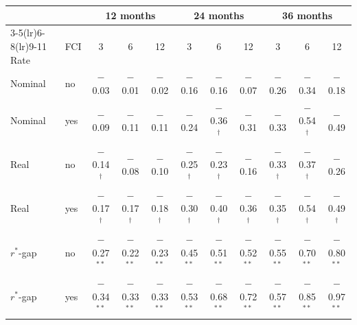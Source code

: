 \begin{tabular}{llccccccccc}
\toprule
 & & \multicolumn{3}{c}{12 months} & \multicolumn{3}{c}{24 months} & \multicolumn{3}{c}{36 months}\\
\cmidrule(lr){3-5}\cmidrule(lr){6-8}\cmidrule(lr){9-11}
Rate & FCI & 3 & 6 & 12 & 3 & 6 & 12 & 3 & 6 & 12 \\
\midrule
Nominal & no & $-$0.03 & $-$0.01 & $-$0.02 & $-$0.16 & $-$0.16 & $-$0.07 & $-$0.26 & $-$0.34 & $-$0.18 \\
Nominal & yes & $-$0.09 & $-$0.11 & $-$0.11 & $-$0.24 & $-$0.36$^{\dagger}$ & $-$0.31 & $-$0.33 & $-$0.54$^{\dagger}$ & $-$0.49 \\
\midrule
Real & no & $-$0.14$^{\dagger}$ & $-$0.08 & $-$0.10 & $-$0.25$^{\dagger}$ & $-$0.23$^{\dagger}$ & $-$0.16 & $-$0.33$^{\dagger}$ & $-$0.37$^{\dagger}$ & $-$0.26 \\
Real & yes & $-$0.17$^{\dagger}$ & $-$0.17$^{\dagger}$ & $-$0.18$^{\dagger}$ & $-$0.30$^{\dagger}$ & $-$0.40$^{\dagger}$ & $-$0.36$^{\dagger}$ & $-$0.35$^{\dagger}$ & $-$0.54$^{\dagger}$ & $-$0.49$^{\dagger}$ \\
\midrule
$r^*$-gap & no & $-$0.27$^{**}$ & $-$0.22$^{**}$ & $-$0.23$^{**}$ & $-$0.45$^{**}$ & $-$0.51$^{**}$ & $-$0.52$^{**}$ & $-$0.55$^{**}$ & $-$0.70$^{**}$ & $-$0.80$^{**}$ \\
$r^*$-gap & yes & $-$0.34$^{**}$ & $-$0.33$^{**}$ & $-$0.33$^{**}$ & $-$0.53$^{**}$ & $-$0.68$^{**}$ & $-$0.72$^{**}$ & $-$0.57$^{**}$ & $-$0.85$^{**}$ & $-$0.97$^{**}$ \\
\bottomrule
\end{tabular}

